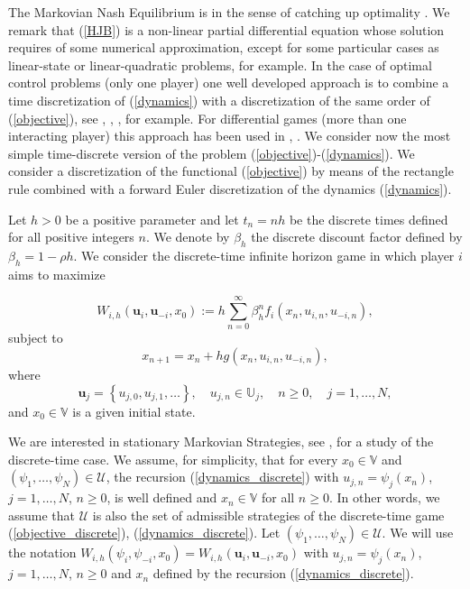 \documentclass[12pt]{article}
\newcommand{\bs}{\boldsymbol}
\newcounter{remark}
\begin{document}
{The Markovian Nash Equilibrium is in the sense of catching up optimality \cite{Carlson}}.
We remark that (\ref{HJB}) is a non-linear partial differential equation whose solution requires of some numerical approximation, except for some particular cases as linear-state or linear-quadratic problems, for example.
In the case of optimal control problems (only one player) one well developed approach is to combine a time discretization of (\ref{dynamics}) with a discretization of the same order of (\ref{objective}), see \cite{Bardi}, \cite{Falcone_Ferreti}, \cite{Falcone}, for example. For differential games (more than one interacting player) this approach has been used in \cite{DeFrutos2015}, \cite{DeFrutos2016}.
We consider now the most simple time-discrete version of the problem (\ref{objective})-(\ref{dynamics}). We consider a
discretization of the functional (\ref{objective}) by means of the rectangle rule combined with a forward Euler discretization of the dynamics (\ref{dynamics}).

Let $h>0$ be a positive parameter and let $t_n =nh$ be the
discrete times defined for all positive integers $n$. We denote by $\beta_h$ the discrete discount factor defined by $\beta_h=1-\rho h$. We consider the discrete-time infinite horizon game in which player $i$ aims to maximize

\begin{equation}
W_{i,h}(\bs{u}_i,\bs{u}_{-i},x_0):=h\sum_{n=0}^\infty \beta_h^n f_i(x_n,u_{i,n},u_{-i,n}), \label{objective_discrete}
\end{equation}
subject to
\begin{equation}\label{dynamics_discrete}
x_{n+1}=x_n+hg(x_n,u_{i,n},u_{-i,n}),
\end{equation}
where
$$
\bs{u}_j=\left\{u_{j,0},u_{j,1},\ldots\right\},\quad u_{j,n}\in\mathbb{U}_j,\quad n\ge 0,\quad j=1,\dots, N,
$$
and $x_0\in\mathbb{V}$ is a given initial state.


We are interested in stationary Markovian Strategies, see \cite{Haurie_et_al}, \cite{Krawczyk_Petkrov} for a study of the discrete-time  case. We assume, for simplicity, that for every $x_0\in \mathbb{V}$ and $(\psi_1,\dots,\psi_N)\in\mathcal{U}$,
the recursion (\ref{dynamics_discrete}) with $u_{j,n}=\psi_j(x_n)$, $j=1,\dots, N$, $n\ge 0$, is well defined and $x_n\in\mathbb{V}$ for all $n\ge 0$. In other words, we assume that $\mathcal{U}$ is also the set of admissible strategies of the  discrete-time game (\ref{objective_discrete}), (\ref{dynamics_discrete}). Let $(\psi_1,\dots,\psi_N)\in\mathcal{U}$. We will use the notation
$W_{i,h}(\psi_i,\psi_{-i},x_0)=W_{i,h}(\bs{u}_i,\bs{u}_{-i},x_0)$ with $u_{j,n}=\psi_j(x_n)$, $j=1,\dots, N$, $n\ge 0$ and $x_n$ defined by the recursion (\ref{dynamics_discrete}).
\end{document}
